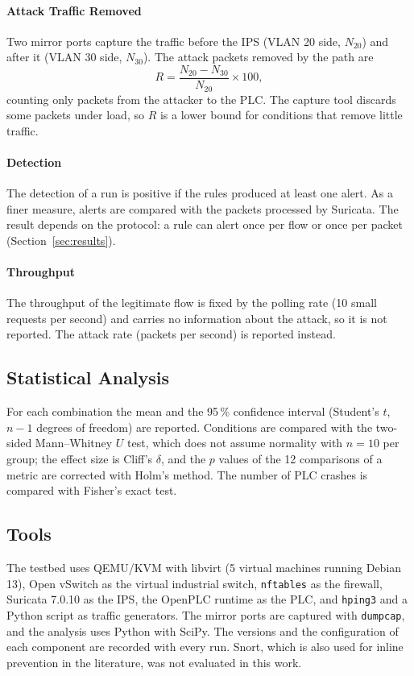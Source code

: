 \paragraph{Attack Traffic Removed}
Two mirror ports capture the traffic before the IPS (VLAN 20 side, $N_{20}$) and after it (VLAN 30 side, $N_{30}$). The attack packets removed by the path are
\begin{equation}
R=\frac{N_{20}-N_{30}}{N_{20}}\times 100,
\end{equation}
counting only packets from the attacker to the PLC. The capture tool discards some packets under load, so $R$ is a lower bound for conditions that remove little traffic.

\paragraph{Detection}
The detection of a run is positive if the rules produced at least one alert. As a finer measure, alerts are compared with the packets processed by Suricata. The result depends on the protocol: a rule can alert once per flow or once per packet (Section~\ref{sec:results}).

\paragraph{Throughput}
The throughput of the legitimate flow is fixed by the polling rate (10 small requests per second) and carries no information about the attack, so it is not reported. The attack rate (packets per second) is reported instead.

\subsection{Statistical Analysis}
For each combination the mean and the 95\,\% confidence interval (Student's $t$, $n-1$ degrees of freedom) are reported. Conditions are compared with the two-sided Mann--Whitney $U$ test, which does not assume normality with $n=10$ per group; the effect size is Cliff's $\delta$, and the $p$ values of the 12 comparisons of a metric are corrected with Holm's method. The number of PLC crashes is compared with Fisher's exact test.

\subsection{Tools}
The testbed uses QEMU/KVM with libvirt (5 virtual machines running Debian 13), Open vSwitch as the virtual industrial switch, \texttt{nftables} as the firewall, Suricata 7.0.10 as the IPS, the OpenPLC runtime as the PLC, and \texttt{hping3} and a Python script as traffic generators. The mirror ports are captured with \texttt{dumpcap}, and the analysis uses Python with SciPy. The versions and the configuration of each component are recorded with every run. Snort, which is also used for inline prevention in the literature, was not evaluated in this work.
